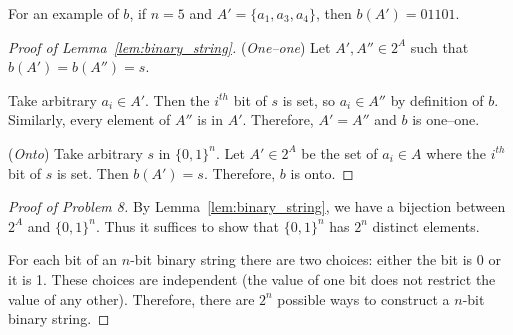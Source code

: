 For an example of $b$, if $n = 5$ and $A' = \{a_1,a_3,a_4\}$, then $b(A') = 01101$. %

\begin{proof}[Proof of Lemma~\ref{lem:binary_string}]
	(\textit{One--one})
	Let $A', A'' \in 2^A$ such that $b(A') = b(A'') = s$.

	Take arbitrary $a_i \in A'$.
	Then the $i^{th}$ bit of $s$ is set, so $a_i \in A''$ by definition of $b$.
	Similarly, every element of $A''$ is in $A'$.
	Therefore, $A' = A''$ and $b$ is one--one.

	(\textit{Onto})
	Take arbitrary $s$ in $\{0,1\}^n$.
	Let $A' \in 2^{A}$ be the set of $a_i \in A$ where the $i^{th}$ bit of $s$ is set.
	Then $b(A') = s$.
	Therefore, $b$ is onto.
\end{proof}

\begin{proof}[Proof of Problem 8]
	By Lemma~\ref{lem:binary_string}, we have a bijection between $2^A$ and $\{0,1\}^n$.
	Thus it suffices to show that $\{0,1\}^n$ has $2^n$ distinct elements.

	For each bit of an $n$-bit binary string there are two choices: either the bit is 0 or it is 1.
	These choices are independent (the value of one bit does not restrict the value of any other).
	Therefore, there are $2^n$ possible ways to construct a $n$-bit binary string.
\end{proof}
